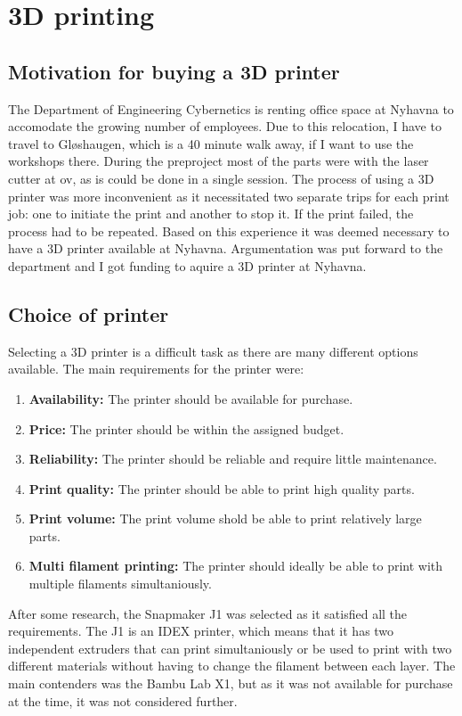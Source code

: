 \section{3D printing}

\subsection{Motivation for buying a 3D printer}
The Department of Engineering Cybernetics is renting office space at Nyhavna to accomodate the growing number of employees.
Due to this relocation, I have to travel to Gløshaugen, which is a 40 minute walk away, if I want to use the workshops there.
During the preproject most of the parts were with the laser cutter at \gls{ov}, as is could be done in a single session.
The process of using a 3D printer was more inconvenient as it necessitated two separate trips for each print job: one to initiate the print and another to stop it.
If the print failed, the process had to be repeated.
Based on this experience it was deemed necessary to have a 3D printer available at Nyhavna.
Argumentation was put forward to the department and I got funding to aquire a 3D printer at Nyhavna.

\subsection{Choice of printer}
Selecting a 3D printer is a difficult task as there are many different options available.
The main requirements for the printer were:
\begin{enumerate}
    \item \textbf{Availability:} The printer should be available for purchase.
    \item \textbf{Price:} The printer should be within the assigned budget.
    \item \textbf{Reliability:} The printer should be reliable and require little maintenance.
    \item \textbf{Print quality:} The printer should be able to print high quality parts.
    \item \textbf{Print volume:} The print volume shold be able to print relatively large parts.
    \item \textbf{Multi filament printing:} The printer should ideally be able to print with multiple filaments simultaniously.
\end{enumerate}

After some research, the Snapmaker J1 was selected as it satisfied all the requirements.
The J1 is an IDEX printer, which means that it has two independent extruders that can print simultaniously or be used to print with two different materials without having to change the filament between each layer.
The main contenders was the Bambu Lab X1, but as it was not available for purchase at the time, it was not considered further.


